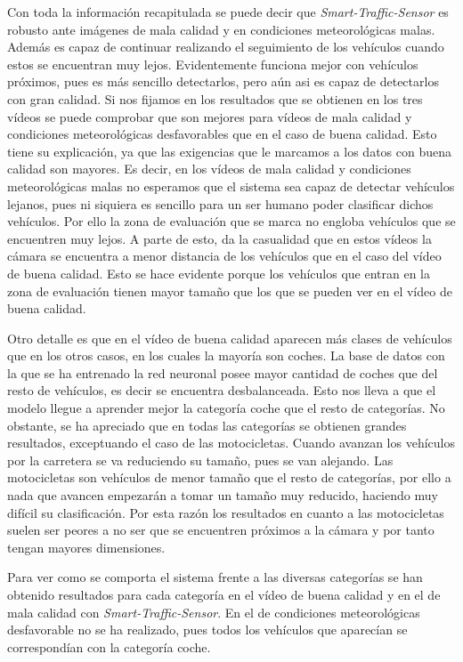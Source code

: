Con toda la información recapitulada se puede decir que \textit{Smart-Traffic-Sensor} es robusto ante imágenes de mala calidad y en condiciones meteorológicas malas. Además es capaz de continuar realizando el seguimiento de los vehículos cuando estos se encuentran muy lejos.
Evidentemente funciona mejor con vehículos próximos, pues es más sencillo detectarlos, pero aún asi es  capaz de detectarlos con gran calidad. Si nos fijamos en los resultados que se obtienen en los tres vídeos se puede comprobar que son mejores para vídeos de mala calidad y condiciones meteorológicas desfavorables que en el caso de buena calidad. Esto tiene su explicación, ya que las exigencias que le marcamos a los datos con buena calidad son mayores. Es decir, en los vídeos de mala calidad y condiciones meteorológicas malas  no esperamos que el sistema sea capaz de detectar vehículos lejanos, pues ni siquiera es sencillo para un ser humano poder clasificar dichos vehículos. Por ello la zona de evaluación que se marca no engloba vehículos que se encuentren muy lejos. A parte de esto, da la casualidad que en estos vídeos la cámara se encuentra a menor distancia de los vehículos que en el caso del vídeo de buena calidad. Esto se hace evidente porque los vehículos que entran en la zona de evaluación tienen mayor tamaño que los que se pueden ver en el vídeo de buena calidad.

Otro detalle es que en el vídeo de buena calidad aparecen más clases de vehículos que en los otros casos, en los cuales la mayoría son coches. La base de datos con la que se ha entrenado la red neuronal posee mayor cantidad de coches que del resto de vehículos, es decir se encuentra desbalanceada. Esto nos lleva a que el modelo llegue a aprender mejor la categoría coche que el resto de categorías. No obstante, se ha apreciado que en todas las categorías se obtienen grandes resultados, exceptuando el caso de las motocicletas. Cuando avanzan los vehículos por la carretera se va reduciendo su tamaño, pues se van alejando. Las motocicletas son vehículos de menor tamaño que el resto de categorías, por ello a nada que avancen empezarán a tomar un tamaño muy reducido, haciendo muy difícil su clasificación. Por esta razón los resultados en cuanto a las motocicletas suelen ser peores a no ser que se encuentren próximos a la cámara y por tanto tengan mayores dimensiones.

Para ver como se comporta el sistema frente a las diversas categorías se han obtenido resultados para cada categoría en el vídeo de buena calidad y en el de mala calidad con \textit{Smart-Traffic-Sensor}. En el de condiciones meteorológicas desfavorable no se ha realizado, pues todos los vehículos que aparecían se correspondían con la categoría coche.

